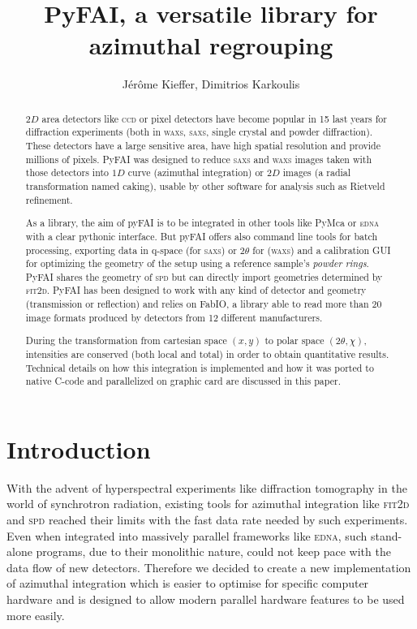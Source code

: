 \documentclass[a4paper]{jpconf}
\begin{document}
\title{PyFAI, a versatile library for azimuthal regrouping}

\author{J\'er\^ome Kieffer, Dimitrios Karkoulis}

\address{European Synchrotron Radiation Facility; 6 rue Jules Horowitz;
38043 Grenoble; France}


\begin{abstract}
$2D$ area detectors like \textsc{ccd} or pixel detectors have become popular
in 15 last years for diffraction experiments (both in \textsc{waxs},
\textsc{saxs}, single crystal and powder diffraction).
These detectors have a large sensitive area, have high spatial
resolution and provide millions of pixels. PyFAI was designed to reduce \textsc{saxs} and
\textsc{waxs} images taken with those detectors into $1D$ curve (azimuthal integration)
or $2D$ images (a radial transformation named caking), usable by other software
for analysis such as Rietveld refinement.

As a library, the aim of pyFAI is to be integrated in other tools like
PyMca\cite{pymca} or \textsc{edna}\cite{edna} with a clear pythonic interface. But pyFAI
offers also command line tools for batch processing, exporting data in q-space (for \textsc{saxs}) or 2$\theta$ for
(\textsc{waxs}) and a calibration GUI for optimizing the geometry of the setup
using a reference sample's \textit{powder rings}.  PyFAI shares the geometry
of \textsc{spd}\cite{spd} but can directly import geometries determined by
\textsc{fit2d}\cite{fit2d1996}.
PyFAI has been designed to work with any kind of detector and geometry (transmission or reflection) and
relies on FabIO\cite{fabio}, a library able to read more than 20 image
formats produced by detectors from 12 different manufacturers.

During the transformation from cartesian space $(x,y)$ to polar
space $(2\theta, \chi )$, intensities are conserved (both local and total)
in order to obtain quantitative results.  Technical details on how this
integration is implemented and how it was ported to native C-code and parallelized on graphic card are
discussed in this paper.
\end{abstract}

\section{Introduction}

With the advent of hyperspectral experiments like diffraction tomography in the
world of synchrotron radiation, existing tools for azimuthal integration like
\textsc{fit2d}\cite{fit2d1996} and \textsc{spd}\cite{spd} reached their limits with the fast data rate
needed by such experiments. Even when integrated into massively parallel
frameworks like \textsc{edna}\cite{edna}, such stand-alone programs, due to their
monolithic nature, could not keep pace with the data flow of new detectors.
Therefore we decided to create a new implementation of azimuthal integration
which is easier to optimise for specific computer hardware and is designed to
allow modern parallel hardware features to be used more easily.
\end{document}
